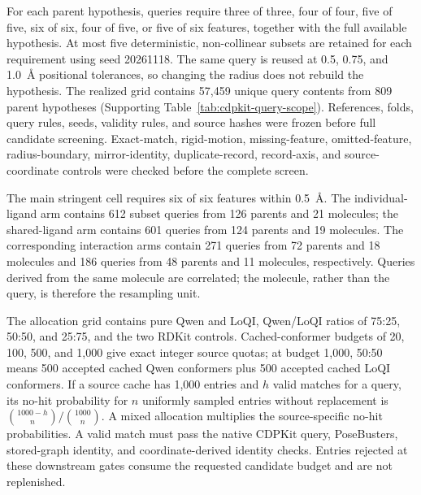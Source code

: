 For each parent hypothesis, queries require three of three, four of four, five of
five, six of six, four of five, or five of six features, together with the full
available hypothesis. At most five deterministic, non-collinear subsets are retained
for each requirement using seed 20261118. The same query is reused at 0.5, 0.75,
and 1.0~\AA{} positional tolerances, so changing the radius does not rebuild the
hypothesis. The realized grid contains 57,459 unique query contents from 809 parent
hypotheses (Supporting Table~\ref{tab:cdpkit-query-scope}). References, folds,
query rules, seeds, validity rules, and source hashes were frozen before full
candidate screening. Exact-match, rigid-motion, missing-feature, omitted-feature,
radius-boundary, mirror-identity, duplicate-record, record-axis, and source-coordinate
controls were checked before the complete screen.

The main stringent cell requires six of six features within 0.5~\AA{}. The
individual-ligand arm contains 612 subset queries from 126 parents and 21 molecules;
the shared-ligand arm contains 601 queries from 124 parents and 19 molecules.
The corresponding interaction arms contain 271 queries from 72 parents and 18
molecules and 186 queries from 48 parents and 11 molecules, respectively. Queries
derived from the same molecule are correlated; the molecule, rather than the query,
is therefore the resampling unit.

The allocation grid contains pure Qwen and LoQI, Qwen/LoQI ratios of 75:25, 50:50,
and 25:75, and the two RDKit controls. Cached-conformer budgets of 20, 100, 500,
and 1,000 give exact integer source quotas; at budget 1,000, 50:50 means 500 accepted
cached Qwen conformers plus 500 accepted cached LoQI conformers. If a source cache
has 1,000 entries and $h$ valid matches for a query, its no-hit probability for $n$
uniformly sampled entries without replacement is
$\binom{1000-h}{n}/\binom{1000}{n}$. A mixed allocation multiplies the source-specific
no-hit probabilities. A valid match must pass the native CDPKit query, PoseBusters,
stored-graph identity, and coordinate-derived identity checks. Entries rejected at
these downstream gates consume the requested candidate budget and are not replenished.

